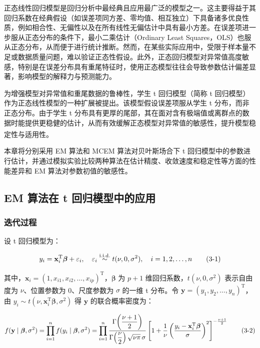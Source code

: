 \documentclass[12pt,a4paper]{ctexart}
\makeatletter
\numberwithin{figure}{section}
\numberwithin{table}{section}
\let\ltx@orig@tag\tag
\renewcommand{\tag}[1]{\refstepcounter{equation}\ltx@orig@tag{#1}}%
\makeatother
\begin{document}
正态线性回归模型是回归分析中最经典且应用最广泛的模型之一。这主要得益于其回归系数在经典假设（如误差项同方差、零均值、相互独立）下具备诸多优良性质，例如相合性、无偏性以及在所有线性无偏估计中具有最小方差。在误差项进一步服从正态分布的条件下，最小二乘估计（Ordinary Least Squares，OLS）也服从正态分布，从而便于进行统计推断。然而，在某些实际应用中，受限于样本量不足或数据质量问题，难以验证正态性假设。此外，正态回归模型对异常值高度敏感，特别是在误差分布具有重尾特征时，使用正态模型往往会导致参数估计偏差显著，影响模型的解释力与预测能力。

为增强模型对异常值和重尾数据的鲁棒性，学生 t 回归模型（简称 t 回归模型）作为正态线性模型的一种扩展被提出。该模型假设误差项服从学生 t 分布，而非正态分布。由于学生 t 分布具有更厚的尾部，其在面对含有极端值或离群点的数据时能提供更稳健的估计，从而有效缓解正态模型对异常值的敏感性，提升模型稳定性与适用性。\textsuperscript{\cite{ref38}}

本章将分别采用 EM 算法和 MCEM 算法对贝叶斯场合下 t 回归模型中的参数进行估计，并通过模拟实验比较两种算法在估计精度、收敛速度和稳定性等方面的性能差异和 EM 算法对参数初值的敏感性。

\subsection{EM 算法在 t 回归模型中的应用}

\subsubsection{迭代过程}

设 t 回归模型为：

\begin{equation}
y_i = \mathbf{x}_i^{\mathrm{T}} \boldsymbol{\beta} + \varepsilon_i, \quad \varepsilon_i \overset{\text{i.i.d.}}{\sim} t(\nu, 0, \sigma^2), \quad i = 1, 2, \ldots, n \tag{3-1}
\end{equation}

其中，$\mathbf{x}_i = (1, x_{i1}, x_{i2}, \ldots, x_{ip})^{\mathrm{T}}$，$\boldsymbol{\beta}$ 为 $p+1$ 维回归系数，$t(\nu, 0, \sigma^2)$ 表示自由度为 $\nu$、位置参数为 0、尺度参数为 $\sigma$ 的一维 t 分布。令 $\mathbf{y} = (y_1, y_2, \ldots, y_n)^{\mathrm{T}}$，由 $y_i \sim t(\nu, \mathbf{x}_i^{\mathrm{T}} \boldsymbol{\beta}, \sigma^2)$ 得 $\mathbf{y}$ 的联合概率密度为：

\begin{equation}
f(\mathbf{y} \mid \boldsymbol{\beta}, \sigma^2) = \prod_{i=1}^{n} f(y_i \mid \boldsymbol{\beta}, \sigma^2) = \prod_{i=1}^{n} \frac{\Gamma\!\left(\dfrac{\nu+1}{2}\right)}{\Gamma\!\left(\dfrac{\nu}{2}\right)\sqrt{\nu\pi}\,\sigma} \left[1 + \frac{1}{\nu}\left(\frac{y_i - \mathbf{x}_i^{\mathrm{T}} \boldsymbol{\beta}}{\sigma}\right)^2\right]^{-\frac{\nu+1}{2}} \tag{3-2}
\end{equation}
\end{document}
